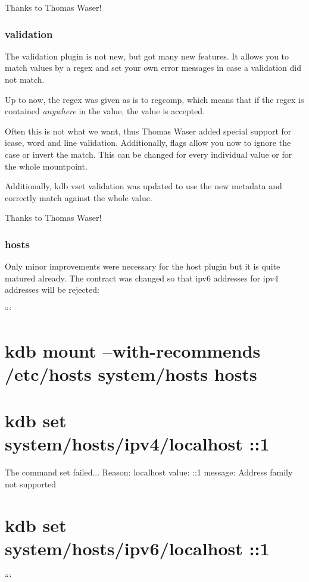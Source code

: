 Thanks to Thomas Waser!

\subsubsection*{validation}

The validation plugin is not new, but got many new features. It allows you to match values by a regex and set your own error messages in case a validation did not match.

Up to now, the regex was given as is to regcomp, which means that if the regex is contained {\itshape anywhere} in the value, the value is accepted.

Often this is not what we want, thus Thomas Waser added special support for icase, word and line validation. Additionally, flags allow you now to ignore the case or invert the match. This can be changed for every individual value or for the whole mountpoint.

Additionally, {\ttfamily kdb vset} validation was updated to use the new metadata and correctly match against the whole value.

Thanks to Thomas Waser!

\subsubsection*{hosts}

Only minor improvements were necessary for the host plugin but it is quite matured already. The contract was changed so that ipv6 addresses for ipv4 addresses will be rejected\+:

``` \section*{kdb mount --with-\/recommends /etc/hosts system/hosts hosts}

\section*{kdb set system/hosts/ipv4/localhost \+:\+:1}

The command set failed... Reason\+: localhost value\+: \+:\+:1 message\+: Address family not supported \section*{kdb set system/hosts/ipv6/localhost \+:\+:1}

```

